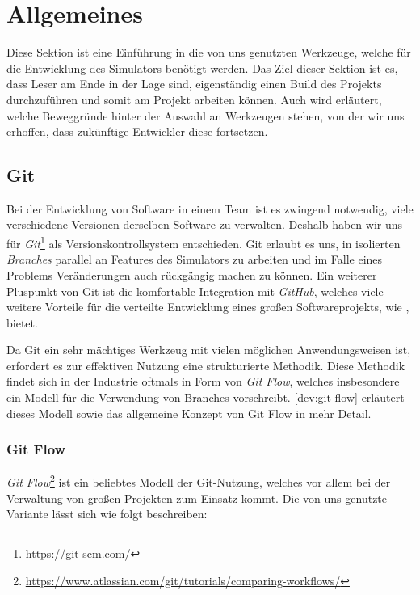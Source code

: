
\section{Allgemeines}
\label{dev:general}

Diese Sektion ist eine Einführung in die von uns genutzten Werkzeuge, welche für
die Entwicklung des Simulators benötigt werden. Das Ziel dieser Sektion ist es,
dass Leser am Ende in der Lage sind, eigenständig einen Build des Projekts
durchzuführen und somit am Projekt arbeiten können. Auch wird erläutert, welche
Beweggründe hinter der Auswahl an Werkzeugen stehen, von der wir uns erhoffen,
dass zukünftige Entwickler diese fortsetzen.

\subsection{Git}

Bei der Entwicklung von Software in einem Team ist es zwingend notwendig, viele
verschiedene Versionen derselben Software zu verwalten. Deshalb haben wir uns
für \emph{Git}\footnote{\url{https://git-scm.com/}} als Versionskontrollsystem
entschieden. Git erlaubt es uns, in isolierten \emph{Branches} parallel an
Features des Simulators zu arbeiten und im Falle eines Problems Veränderungen
auch rückgängig machen zu können. Ein weiterer Pluspunkt von Git ist die
komfortable Integration mit \emph{GitHub}, welches viele weitere Vorteile für
die verteilte Entwicklung eines großen Softwareprojekts, wie \erasim{}, bietet.

Da Git ein sehr mächtiges Werkzeug mit vielen möglichen Anwendungsweisen ist,
erfordert es zur effektiven Nutzung eine strukturierte Methodik. Diese Methodik
findet sich in der Industrie oftmals in Form von \emph{Git Flow}, welches
insbesondere ein Modell für die Verwendung von Branches vorschreibt.
\autoref{dev:git-flow} erläutert dieses Modell sowie das allgemeine Konzept von
Git Flow in mehr Detail.

\subsubsection{Git Flow}
\label{dev:git-flow}

\emph{Git
Flow}\footnote{\url{https://www.atlassian.com/git/tutorials/comparing-workflows/}}
ist ein beliebtes Modell der Git-Nutzung, welches vor allem bei der Verwaltung
von großen Projekten zum Einsatz kommt. Die von uns genutzte Variante lässt sich
wie folgt beschreiben:

